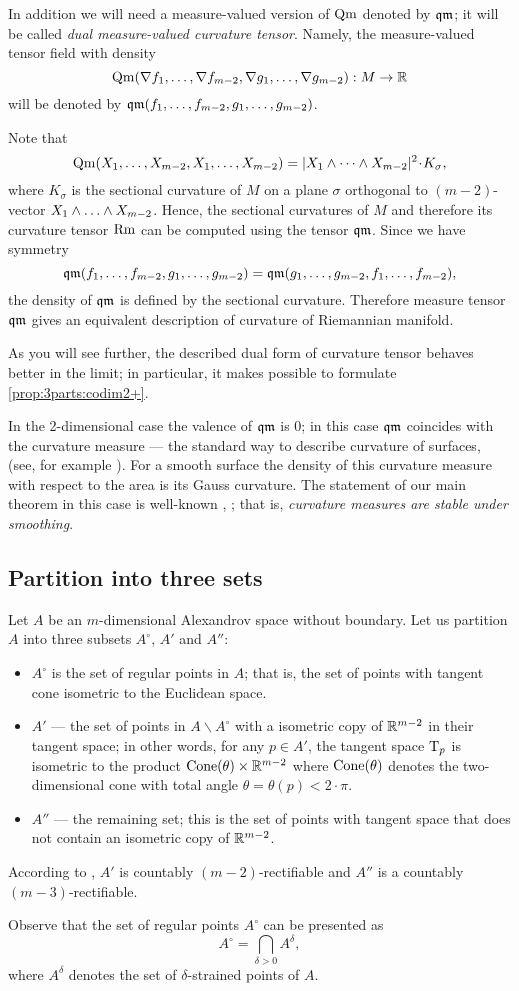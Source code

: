 In addition we will need a measure-valued version of $\operatorname{\rm Qm}$ denoted by $\operatorname{\mathfrak{qm}}$;
it will be called \emph{dual measure-valued curvature tensor}.
Namely, the measure-valued tensor field with density
\[\operatorname{\rm Qm}(\nabla f_1,\dots,\nabla f_{m-2},\nabla g_1,\dots,\nabla g_{m-2}): M\to\mathbb{R}\]
will be denoted by $\operatorname{\mathfrak{qm}}(f_1,\dots,f_{m-2},g_1,\dots,g_{m-2})$.


Note that 
$$\Qm(X_1,\dots,X_{m-2},X_1,\dots,X_{m-2})
=
|X_1\wedge\dots \wedge X_{m-2}|^2\cdot K_\sigma, $$
where $K_\sigma$ is the sectional curvature of $M$ 
on a plane $\sigma$ orthogonal to $(m-2)$-vector
$X_1\wedge\zz\dots \wedge X_{m-2}$.
Hence, the sectional curvatures of $M$ and therefore its curvature tensor $\operatorname{\rm Rm}$ can  be computed using the tensor
$\operatorname{\mathfrak{qm}}$.
Since we have symmetry
$$\operatorname{\mathfrak{qm}}(f_1,\dots,f_{m-2},g_1,\dots,g_{m-2})=
\operatorname{\mathfrak{qm}}(g_1,\dots,g_{m-2},f_1,\dots,f_{m-2}),$$
the density of $\operatorname{\mathfrak{qm}}$ is defined by the sectional curvature.
Therefore measure tensor $\operatorname{\mathfrak{qm}}$
gives an equivalent description of curvature of Riemannian manifold.

As you will see further, the described dual form of curvature tensor behaves better in the limit;
in particular, it makes possible to formulate \ref{prop:3parts:codim2+}.

In the 2-dimensional case the valence of $\operatorname{\mathfrak{qm}}$ is $0$;
in this case $\operatorname{\mathfrak{qm}}$ coincides with the curvature measure --- the standard way to describe curvature of surfaces, 
(see, for example \cite{R}).
For a smooth surface the density of this curvature measure with respect to the area
is its Gauss curvature.
The statement of our main theorem in this case
is well-known \cite[Theorem 8.4.2]{R}, \cite{AZ};
that is, \emph{curvature measures are stable under smoothing}.


\subsection{Partition into three sets}

Let $A$ be an $m$-dimensional Alexandrov space without boundary. 
Let us partition $A$ into three subsets $A^\circ$, $A'$ and $A''$:
\begin{itemize}
\item $A^\circ$ is the set of regular points in $A$; that is, the set of points with tangent cone isometric to the Euclidean space.
\item $A'$ --- the set of points in $A\backslash A^\circ$ with a isometric copy of $\mathbb{R}^{m-2}$ in their tangent space;
in other words, for any $p\in A'$, the tangent space $\mathrm{T}_p$ is isometric to the product $\operatorname{Cone}(\theta)\times\mathbb{R}^{m-2}$ where $\operatorname{Cone}(\theta)$ denotes the two-dimensional cone with total angle $\theta=\theta(p)<2\cdot \pi$.
\item $A''$ --- the remaining set; this is the set of points with tangent space that does not contain an isometric copy of $\mathbb{R}^{m-2}$.
\end{itemize}
According to \cite{li-naber}, $A'$ is countably $(m-2)$-rectifiable and $A''$ is a countably $(m-3)$-rectifiable. 

Observe that the set of regular points $A^\circ$ can be presented as
$$A^{\circ}=\bigcap_{\delta>0} A^\delta,$$
where $A^\delta$ denotes the set of $\delta$-strained points of $A$.
